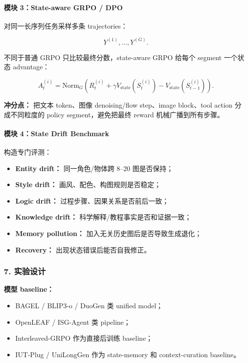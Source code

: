\paragraph{模块 3：State-aware GRPO / DPO}

对同一长序列任务采样多条 trajectories：

\[
Y^{(1)},\ldots,Y^{(G)}.
\]

不同于普通 GRPO 只比较最终分数，state-aware GRPO 给每个 segment 一个状态 advantage：

\[
A_t^{(i)}
=
\mathrm{Norm}_G
\left(
R_t^{(i)}
+
\gamma V_\text{state}(S_t^{(i)})
-
V_\text{state}(S_{t-1}^{(i)})
\right).
\]

\textbf{冲分点：} 把文本 token、图像 denoising/flow step、image block、tool action 分成不同粒度的 policy segment，避免把最终 reward 机械广播到所有步骤。

\paragraph{模块 4：State Drift Benchmark}

构造专门评测：

\begin{itemize}[leftmargin=1.5em]
  \item \textbf{Entity drift：} 同一角色/物体跨 8--20 图是否保持；
  \item \textbf{Style drift：} 画风、配色、构图规则是否稳定；
  \item \textbf{Logic drift：} 过程步骤、因果关系是否前后一致；
  \item \textbf{Knowledge drift：} 科学解释/教程事实是否和证据一致；
  \item \textbf{Memory pollution：} 加入无关历史图后是否导致生成退化；
  \item \textbf{Recovery：} 出现状态错误后能否自我修正。
\end{itemize}

\subsubsection*{7. 实验设计}

\textbf{模型 baseline：}

\begin{itemize}[leftmargin=1.5em]
  \item BAGEL / BLIP3-o / DuoGen 类 unified model；
  \item OpenLEAF / ISG-Agent 类 pipeline；
  \item Interleaved-GRPO 作为直接后训练 baseline；
  \item IUT-Plug / UniLongGen 作为 state-memory 和 context-curation baseline。
\end{itemize}

